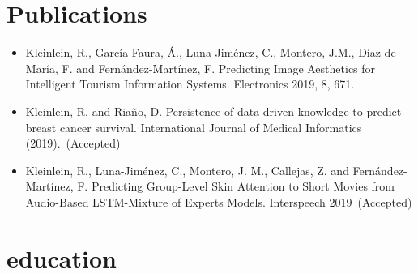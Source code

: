 \documentclass[]{friggeri-cv-a4}
\begin{document}
\section{Publications}

\begin{itemize}
\item Kleinlein, R., García-Faura, Á., Luna Jiménez, C., Montero, J.M., Díaz-de-María, F. and Fernández-Martínez, F. Predicting Image Aesthetics for Intelligent Tourism Information Systems. Electronics 2019, 8, 671.
\item Kleinlein, R. and Riaño, D. Persistence of data-driven knowledge to predict breast cancer survival. International Journal of Medical Informatics (2019).~(Accepted)
\item Kleinlein, R., Luna-Jiménez, C., Montero, J. M., Callejas, Z. and Fernández-Martínez, F. Predicting Group-Level Skin Attention to Short Movies from Audio-Based LSTM-Mixture of Experts Models. Interspeech 2019~(Accepted)
\end{itemize}


\section{education}
\end{document}

